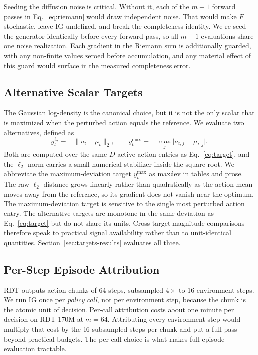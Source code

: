 \documentclass{article}
\begin{document}
Seeding the diffusion noise is critical.
Without it, each of the $m{+}1$ forward passes in Eq.~\ref{eq:riemann} would draw independent noise.
That would make $F$ stochastic, leave IG undefined, and break the completeness identity.
We re-seed the generator identically before every forward pass, so all $m{+}1$ evaluations share one noise realization.
Each gradient in the Riemann sum is additionally guarded, with any non-finite values zeroed before accumulation, and any material effect of this guard would surface in the measured completeness error.

\subsection{Alternative Scalar Targets}
\label{sec:targets}

The Gaussian log-density is the canonical choice, but it is not the only scalar that is maximized when the perturbed action equals the reference.
We evaluate two alternatives, defined as
\begin{equation}
y_t^{\ell_2} = -\lVert a_t - \mu_t \rVert_2,
\qquad
y_t^{\mathrm{max}} = -\max_j \lvert a_{t,j} - \mu_{t,j} \rvert .
\end{equation}
Both are computed over the same $D$ active action entries as Eq.~\ref{eq:target}, and the $\ell_2$ norm carries a small numerical stabilizer inside the square root.
We abbreviate the maximum-deviation target $y_t^{\mathrm{max}}$ as maxdev in tables and prose.
The raw $\ell_2$ distance grows linearly rather than quadratically as the action mean moves away from the reference, so its gradient does not vanish near the optimum.
The maximum-deviation target is sensitive to the single most perturbed action entry.
The alternative targets are monotone in the same deviation as Eq.~\ref{eq:target} but do not share its units.
Cross-target magnitude comparisons therefore speak to practical signal availability rather than to unit-identical quantities.
Section~\ref{sec:targets-results} evaluates all three.

\subsection{Per-Step Episode Attribution}

RDT outputs action chunks of 64 steps, subsampled $4\times$ to 16 environment steps.
We run IG once per \emph{policy call}, not per environment step, because the chunk is the atomic unit of decision.
Per-call attribution costs about one minute per decision on RDT-170M at $m{=}64$.
Attributing every environment step would multiply that cost by the 16 subsampled steps per chunk and put a full pass beyond practical budgets.
The per-call choice is what makes full-episode evaluation tractable.
\end{document}
